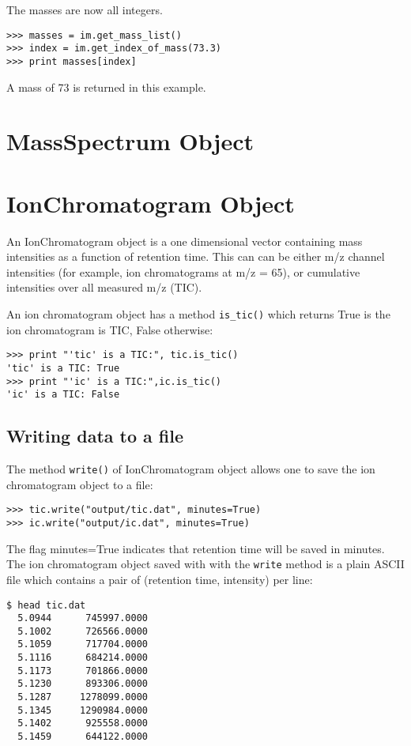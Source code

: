 The masses are now all integers.
\begin{verbatim}
>>> masses = im.get_mass_list()
>>> index = im.get_index_of_mass(73.3)
>>> print masses[index]
\end{verbatim}

A mass of 73 is returned in this example.

\section{MassSpectrum Object}


\section{IonChromatogram Object}

\noindent
An IonChromatogram object is a one dimensional vector containing
mass intensities as a function of retention time. This can can be either
m/z channel intensities (for example, ion chromatograms at m/z = 65),
or cumulative intensities over all measured m/z (TIC).

An ion chromatogram object has a method {\tt is\_tic()} which returns
True is the ion chromatogram is TIC, False otherwise:

\begin{verbatim}
>>> print "'tic' is a TIC:", tic.is_tic()
'tic' is a TIC: True
>>> print "'ic' is a TIC:",ic.is_tic()
'ic' is a TIC: False
\end{verbatim}

\subsection{Writing data to a file}

The method {\tt write()} of IonChromatogram object allows one to save
the ion chromatogram object to a file:

\begin{verbatim}
>>> tic.write("output/tic.dat", minutes=True)
>>> ic.write("output/ic.dat", minutes=True)
\end{verbatim}

\noindent
The flag minutes=True indicates that retention time will be saved in minutes.
The ion chromatogram object saved with with the {\tt write{}} method is a
plain ASCII file which contains a pair of (retention time, intensity) per
line:

\begin{verbatim}
$ head tic.dat
  5.0944      745997.0000
  5.1002      726566.0000
  5.1059      717704.0000
  5.1116      684214.0000
  5.1173      701866.0000
  5.1230      893306.0000
  5.1287     1278099.0000
  5.1345     1290984.0000
  5.1402      925558.0000
  5.1459      644122.0000
\end{verbatim}

